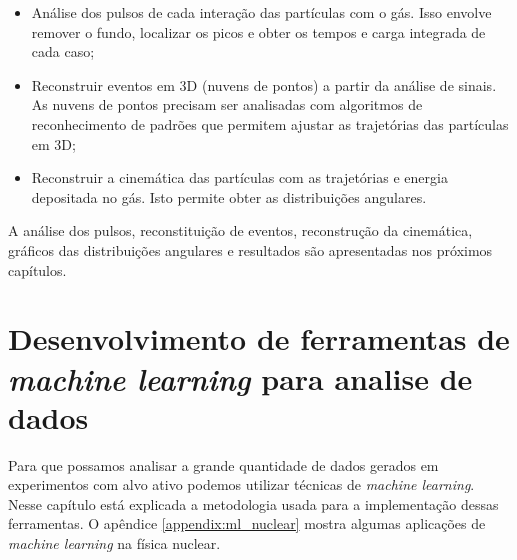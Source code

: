 \documentclass[a4paper,12pt,oneside]{book}
\begin{document}
\begin{itemize}
    \item Análise dos pulsos de cada interação das partículas com o gás. Isso envolve remover o fundo, localizar os picos e obter os tempos e carga integrada de cada caso;
    \item Reconstruir eventos em 3D (nuvens de pontos) a partir da análise de sinais. As nuvens de pontos precisam ser analisadas com algoritmos de reconhecimento de padrões que permitem ajustar as trajetórias das partículas em 3D;
    \item Reconstruir a cinemática das partículas com as trajetórias e energia depositada no gás. Isto permite obter as distribuições angulares. 
\end{itemize}


\par A análise dos pulsos, reconstituição de eventos, reconstrução da cinemática, gráficos das distribuições angulares e resultados são apresentadas nos próximos capítulos.

\chapter{Desenvolvimento de ferramentas de \textit{machine learning} para analise de dados}\label{sec:ml}

\par Para que possamos analisar a grande quantidade de dados gerados em experimentos com alvo ativo podemos utilizar técnicas de \textit{machine learning}. Nesse capítulo está explicada a metodologia usada para a implementação dessas ferramentas. O apêndice \ref{appendix:ml_nuclear} mostra algumas aplicações de \textit{machine learning} na física nuclear.
\end{document}
